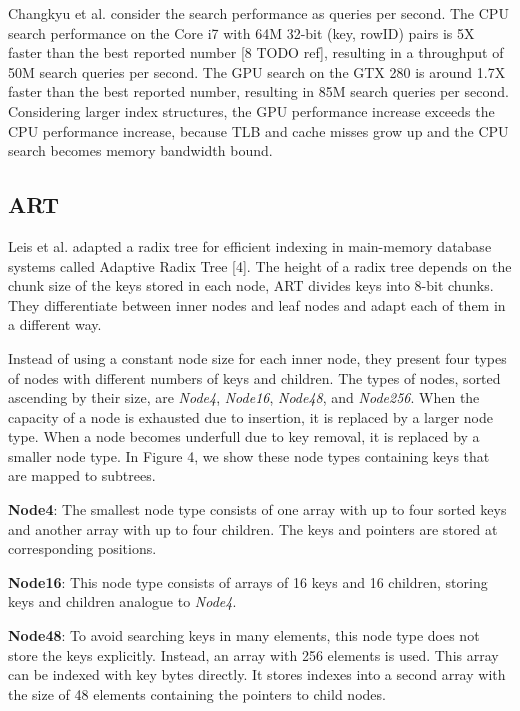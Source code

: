 \documentclass[conference]{IEEEtran}
\begin{document}
Changkyu et al. consider the search performance as queries per second. The CPU search performance on the Core i7 with 64M 32-bit (key, rowID) pairs is 5X faster than the best reported number [8 TODO ref], resulting in a throughput of 50M search queries per second. The GPU search on the GTX 280 is around 1.7X faster than the best reported number, resulting in 85M search queries per second. Considering larger index structures, the GPU performance increase exceeds the CPU performance increase, because TLB and cache misses grow up and the CPU search becomes memory bandwidth bound.


\subsection{ART}\label{SCM}
Leis et al. adapted a radix tree for efficient indexing in main-memory database systems called Adaptive Radix Tree [4]. The height of a radix tree depends on the chunk size of the keys stored in each node, ART divides keys into 8-bit chunks. They differentiate between inner nodes and leaf nodes and adapt each of them in a different way.

Instead of using a constant node size for each inner node, they present four types of nodes with different numbers of keys and children. The types of nodes, sorted ascending by their size, are \emph{Node4}, \emph{Node16}, \emph{Node48}, and \emph{Node256}. When the capacity of a node is exhausted due to insertion, it is replaced by a larger node type. When a node becomes underfull due to key removal, it is replaced by a smaller node type. In Figure 4, we show these node types containing keys that are mapped to subtrees.

\textbf{Node4}: The smallest node type consists of one array with up to four sorted keys and another array with up to four children. The keys and pointers are stored at corresponding positions.

\textbf{Node16}: This node type consists of arrays of 16 keys and 16 children, storing keys and children analogue to \emph{Node4}.

\textbf{Node48}: To avoid searching keys in many elements, this node type does not store the keys explicitly. Instead, an array with 256 elements is used. This array can be indexed with key bytes directly. It stores indexes into a second array with the size of 48 elements containing the pointers to child nodes.
\end{document}
